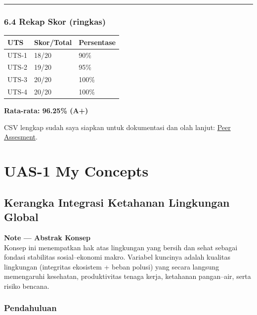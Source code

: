 \documentclass[
  letterpaper,
  DIV=11,
  numbers=noendperiod]{scrreprt}
\begin{document}
\begin{center}\rule{0.5\linewidth}{0.5pt}\end{center}

\subsection{6.4 Rekap Skor (ringkas)}\label{rekap-skor-ringkas}

\begin{longtable}[]{@{}lll@{}}
\toprule\noalign{}
UTS & Skor/Total & Persentase \\
\midrule\noalign{}
\endhead
\bottomrule\noalign{}
\endlastfoot
UTS-1 & 18/20 & 90\% \\
UTS-2 & 19/20 & 95\% \\
UTS-3 & 20/20 & 100\% \\
UTS-4 & 20/20 & 100\% \\
\end{longtable}

\textbf{Rata-rata: 96.25\% (A+)}

CSV lengkap sudah saya siapkan untuk dokumentasi dan olah lanjut:
\href{https://docs.google.com/spreadsheets/d/1yx33h3ImTIaWDtkF-bbUP4OTDwy_REeL/edit?gid=1834460180\#gid=1834460180}{Peer
Assesment}.


\chapter{UAS-1 My Concepts}\label{uas-1-my-concepts}

\section{Kerangka Integrasi Ketahanan Lingkungan
Global}\label{kerangka-integrasi-ketahanan-lingkungan-global}

\textbf{Note --- Abstrak Konsep}\\
Konsep ini menempatkan hak atas lingkungan yang bersih dan sehat sebagai
fondasi stabilitas sosial--ekonomi makro. Variabel kuncinya adalah
kualitas lingkungan (integritas ekosistem + beban polusi) yang secara
langsung memengaruhi kesehatan, produktivitas tenaga kerja, ketahanan
pangan--air, serta risiko bencana.

\subsection{Pendahuluan}\label{pendahuluan}
\end{document}
